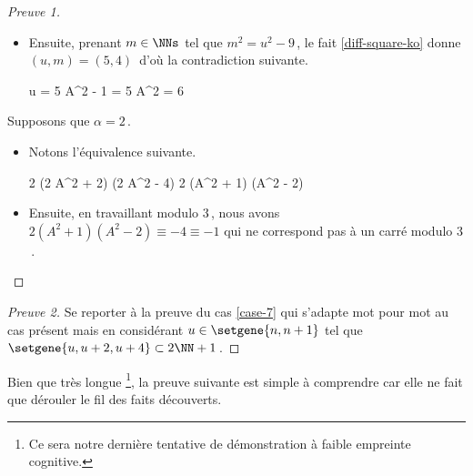 \begin{proof}[Preuve 1]
\begin{itemize}
		\item Ensuite, prenant $m \in \NNs$ tel que $m^2 = u^2 - 9$\,, le fait \ref{diff-square-ko} donne $(u, m) = (5, 4)$\, d'où la contradiction suivante.
        
        \noindent\kern-6pt%
        \begin{stepcalc}[style=sar, ope=\iff]
        	u = 5
    	\explnext{}
        	A^2 - 1 = 5
        	A^2 = 6
        \end{stepcalc}
    \end{itemize}
    
    \medskip
    
    Supposons que $\alpha = 2$\,.
    
    \begin{itemize}
    	\item Notons l'équivalence suivante.
        
        \noindent\kern-6pt%
        \begin{stepcalc}[style=ar*, ope=\iff]
        	2 (2 A^2 + 2) (2 A^2 - 4) \in \NNssquare
        	2 (A^2 + 1) (A^2 - 2) \in \NNssquare
        \end{stepcalc}

		\item Ensuite, en travaillant modulo $3$\,, nous avons
		$2 (A^2 + 1) (A^2 - 2) \equiv -4 \equiv -1$ qui ne correspond pas à un carré modulo $3$\,.
		\qedhere 
    \end{itemize}   
\end{proof}



	
\begin{proof}[Preuve 2]
	Se reporter à la preuve du cas \ref{case-7} qui s'adapte mot pour mot au cas présent mais en considérant $u \in \setgene{n, n+1}$ tel que $\setgene{u, u + 2, u + 4} \subset 2 \NN + 1$\,.
\end{proof}




Bien que très longue
\footnote{
	Ce sera notre dernière tentative de démonstration à faible empreinte cognitive.
},
la preuve suivante est simple à comprendre car elle ne fait que dérouler le fil des faits découverts.

